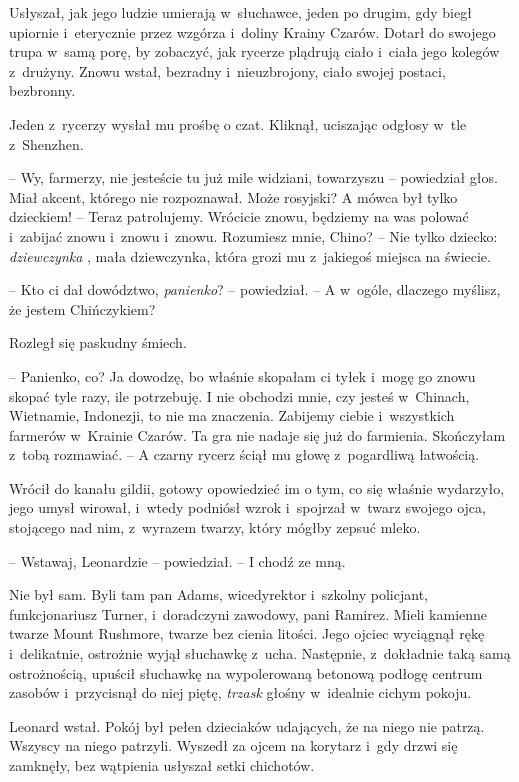 \documentclass[oneside,polish,11pt,rmheadings]{mwbk}
\begin{document}
Usłyszał, jak jego ludzie umierają w~słuchawce, jeden po drugim, gdy biegł upiornie i~eterycznie przez wzgórza i~doliny Krainy Czarów. Dotarł do swojego trupa w~samą porę, by zobaczyć, jak rycerze plądrują ciało i~ciała jego kolegów z~drużyny. Znowu wstał, bezradny i~nieuzbrojony, ciało swojej postaci, bezbronny. 


Jeden z~rycerzy wysłał mu prośbę o czat. Kliknął, uciszając odgłosy w~tle z~Shenzhen. 


-- Wy, farmerzy, nie jesteście tu już mile widziani, towarzyszu -- powiedział głos. Miał akcent, którego nie rozpoznawał. Może rosyjski? A mówca był tylko dzieckiem! -- Teraz patrolujemy. Wrócicie znowu, będziemy na was polować i~zabijać znowu i~znowu i~znowu. Rozumiesz mnie, Chino? -- Nie tylko dziecko: \textit{dziewczynka }, mała dziewczynka, która grozi mu z~jakiegoś miejsca na świecie. 


-- Kto ci dał dowództwo, \textit{panienko}? -- powiedział. -- A w~ogóle, dlaczego myślisz, że jestem Chińczykiem? 


Rozległ się paskudny śmiech. 

-- Panienko, co? Ja dowodzę, bo właśnie skopałam ci tyłek i~mogę go znowu skopać tyle razy, ile potrzebuję. I nie obchodzi mnie, czy jesteś w~Chinach, Wietnamie, Indonezji, to nie ma znaczenia. Zabijemy ciebie i~wszystkich farmerów w~Krainie Czarów. Ta gra nie nadaje się już do farmienia. Skończyłam z~tobą rozmawiać. -- A czarny rycerz ściął mu głowę z~pogardliwą łatwością. 


Wrócił do kanału gildii, gotowy opowiedzieć im o tym, co się właśnie wydarzyło, jego umysł wirował, i~wtedy podniósł wzrok i~spojrzał w~twarz swojego ojca, stojącego nad nim, z~wyrazem twarzy, który mógłby zepsuć mleko. 


-- Wstawaj, Leonardzie -- powiedział. -- I chodź ze mną. 


Nie był sam. Byli tam pan Adams, wicedyrektor i~szkolny policjant, funkcjonariusz Turner, i~doradczyni zawodowy, pani Ramirez. Mieli kamienne twarze Mount Rushmore, twarze bez cienia litości. Jego ojciec wyciągnął rękę i~delikatnie, ostrożnie wyjął słuchawkę z~ucha. Następnie, z~dokładnie taką samą ostrożnością, upuścił słuchawkę na wypolerowaną betonową podłogę centrum zasobów i~przycisnął do niej piętę, \textit{trzask }głośny w~idealnie cichym pokoju. 


Leonard wstał. Pokój był pełen dzieciaków udających, że na niego nie patrzą. Wszyscy na niego patrzyli. Wyszedł za ojcem na korytarz i~gdy drzwi się zamknęły, bez wątpienia usłyszał setki chichotów. 
\end{document}

